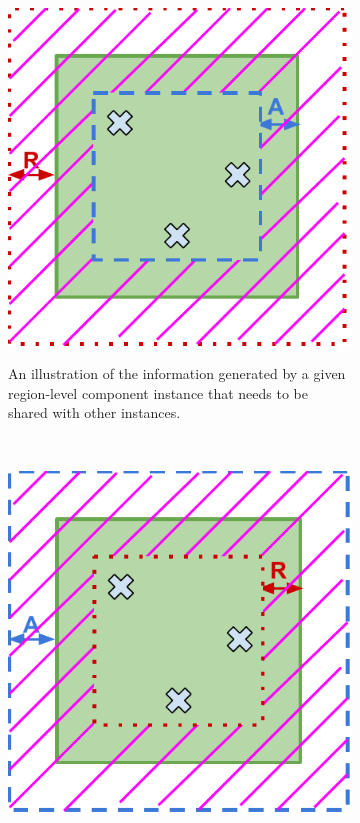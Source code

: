 \begin{figure}
\centering
\begin{subfigure}{0.4\textwidth}
  \centering
  \includegraphics[width=\linewidth]{figures/mechanisms/spatial_ctx_mgmt/out_data.pdf}
  \label{fig:spatial_ctx_out_data}
  \caption{An illustration of the information generated by a given region-level component instance that needs to be shared with other instances.}
\end{subfigure}%
~~~
\begin{subfigure}{0.4\textwidth}
  \centering
  \includegraphics[width=\linewidth]{figures/mechanisms/spatial_ctx_mgmt/in_data.pdf}

\end{subfigure}
\end{figure}
